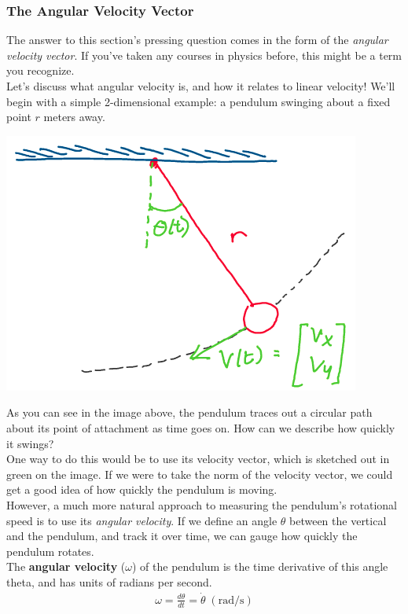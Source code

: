 \documentclass[oneside]{book}
\begin{document}
\subsubsection{The Angular Velocity Vector}
The answer to this section's pressing question comes in the form of the \textit{angular velocity vector}. If you've taken any courses in physics before, this might be a term you recognize.\\
Let's discuss what angular velocity is, and how it relates to linear velocity! We'll begin with a simple 2-dimensional example: a pendulum swinging about a fixed point $r$ meters away.
\begin{center}
    \includegraphics[scale=0.5]{images/pendulum.png}
\end{center}
As you can see in the image above, the pendulum traces out a circular path about its point of attachment as time goes on. How can we describe how quickly it swings?\\
One way to do this would be to use its velocity vector, which is sketched out in green on the image. If we were to take the norm of the velocity vector, we could get a good idea of how quickly the pendulum is moving.\\
However, a much more natural approach to measuring the pendulum's rotational speed is to use its \textit{angular velocity}. If we define an angle $\theta$ between the vertical and the pendulum, and track it over time, we can gauge how quickly the pendulum rotates.\\
The \textbf{angular velocity} ($\omega$) of the pendulum is the time derivative of this angle theta, and has units of radians per second.
\begin{align}
    \omega = \frac{d\theta}{dt} = \dot\theta \; (\mathrm{rad/s})
\end{align}
\end{document}
